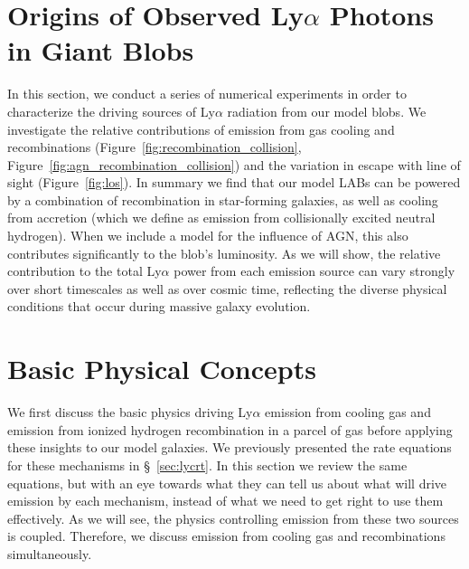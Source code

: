 \section{Origins of Observed Ly\texorpdfstring{$\alpha$}{a} Photons in Giant Blobs}
\label{sec:origins}

In this section, we conduct a series of numerical experiments in order to characterize the driving sources of Ly$\alpha$ radiation from our model blobs.
We investigate the relative contributions of emission from gas cooling and recombinations (Figure~\ref{fig:recombination_collision}, Figure~\ref{fig:agn_recombination_collision}) and the variation in escape with line of sight (Figure~\ref{fig:los}).
In summary we find that our model LABs can be powered by a combination of recombination in star-forming galaxies, as well as cooling from accretion (which we define as emission from collisionally excited neutral hydrogen).
When we include a model for the influence of AGN, this also contributes significantly to the blob's luminosity.
As we will show, the relative contribution to the total Ly$\alpha$ power from each emission source can vary strongly over short timescales as well as over cosmic time, reflecting the diverse physical conditions that occur during massive galaxy evolution.


\section{Basic Physical Concepts}
\label{sec:physicalconcepts}
We first discuss the basic physics driving Ly$\alpha$ emission from cooling gas and emission from ionized hydrogen recombination in a parcel of gas before applying these insights to our model galaxies.
We previously presented the rate equations for these mechanisms in \S~\ref{sec:lycrt}.
In this section we review the same equations, but with an eye towards what they can tell us about what will drive emission by each mechanism, instead of what we need to get right to use them effectively.
As we will see, the physics controlling emission from these two sources is coupled.
Therefore, we discuss emission from cooling gas and recombinations simultaneously.

